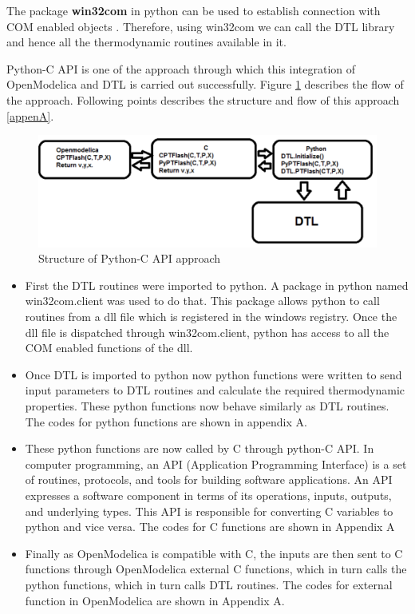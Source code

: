 \documentclass[12pt]{report}
\begin{document}
The package \textbf{win32com} in python can be used to establish connection with COM enabled objects \cite{api}. Therefore, using win32com we can call the DTL library and hence all the thermodynamic routines available in it.

Python-C API is one of the approach through which this integration of OpenModelica and DTL is carried out successfully. Figure \ref{fig:PyC1} describes the flow of the approach. Following points describes the structure and flow of this approach \ref{appenA}.

\begin{figure}
\centering
\includegraphics[width=1\linewidth]{PytC1}
\caption{Structure of Python-C API approach}
\label{fig:PyC1}
\end{figure}
\begin{itemize}
\item{First the DTL routines were imported to python. A package in python named win32com.client was used to do that. This package allows python to call routines from a dll file which is registered in the windows registry. Once the dll file is dispatched through win32com.client, python has access to all the COM enabled functions of the dll.}
\item{Once DTL is imported to python now python functions were written to send input parameters to DTL routines and calculate the required thermodynamic properties. These python functions now behave similarly as DTL routines. The codes for python functions are shown in appendix A.}
\item{These python functions are now called by C through python-C API. In computer programming, an API (Application Programming Interface) is a set of routines, protocols, and tools for building software applications. An API expresses a software component in terms of its operations, inputs, outputs, and underlying types. This API is responsible for converting C variables to python and vice versa. The codes for C functions are shown in Appendix A}
\item{Finally as OpenModelica is compatible with C, the inputs are then sent to C functions through OpenModelica external C functions, which in turn calls the python functions, which in turn calls DTL routines. The codes for external function in OpenModelica are shown in Appendix A.}
\end{itemize}
\end{document}
